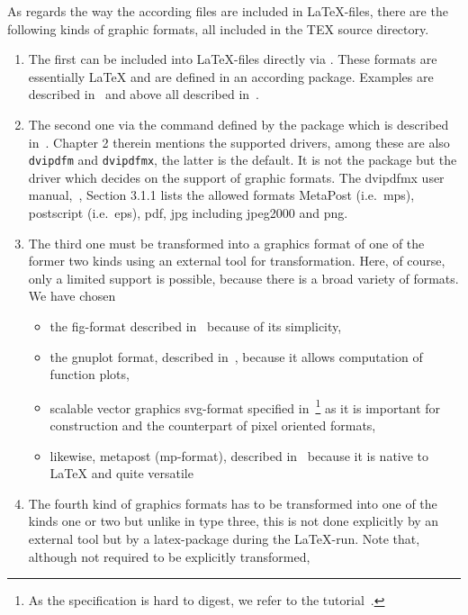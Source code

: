 As regards the way the according files are included in \LaTeX-files, 
there are the following kinds of graphic formats, 
all included in the TEX source directory. 
%
\begin{enumerate}
\item
The first can be included into \LaTeX-files directly via . 
These formats are essentially \LaTeX{}
and are defined in an according package. 
Examples are  described in~\cite{EEpic}
and above all  described in~\cite{TikzPGF}. 
\item
The second one via the command  
defined by the package  
which is described in~\cite{GraX}. 
Chapter 2 therein mentions the supported drivers, 
among these are also \texttt{dvipdfm} and \texttt{dvipdfmx}, the latter is the default. 
It is not the package but the driver 
which decides on the support of graphic formats. 
The dvipdfmx user manual,~\cite{DviPdfMx}, Section 3.1.1 lists the allowed formats 
MetaPost (i.e.~\gls{mps}), postscript (i.e.~\gls{eps}), 
\gls{pdf}, \gls{jpg} including jpeg2000 and \gls{png}. 
\item\label{it:transExp}
The third one must be transformed into a graphics format 
of one of the former two kinds using an external tool for transformation. 
Here, of course, only a limited support is possible, 
because there is a broad variety of formats. 
We have chosen
%
\begin{itemize}
\item
  the \gls{fig}-format described in~\cite{XFigF}
  because of its simplicity, 
\item
  the gnuplot format, described in~\cite{GnuPlot}, 
  because it allows computation of function plots, 
\item
  scalable vector graphics \gls{svg}-format specified in~\cite{Svg11}\footnote%
  { As the specification is hard to digest,
  we refer to the tutorial~\cite{SvgTut}. } 
  as it is important for construction and the counterpart of pixel oriented
  formats,
\item
  likewise, metapost (\gls{mp}-format),
  described in~\cite{MPost} because it is native to \LaTeX{} 
  and quite versatile 
\end{itemize}
\item\label{it:transImp}
The fourth kind of graphics formats 
has to be transformed into one of the kinds one or two 
but unlike in type three, this is not done explicitly 
by an external tool but by a latex-package during the \LaTeX-run. 
Note that, although not required to be explicitly transformed, 

\end{enumerate}
